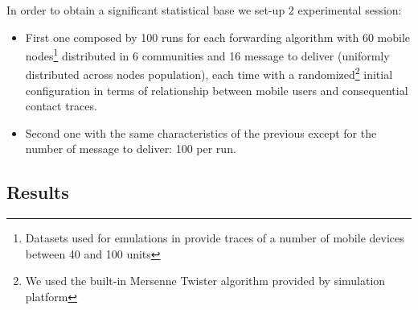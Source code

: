 In order to obtain a significant statistical base we set-up 2 experimental session:
\begin{itemize}
\item First one composed by 100 runs for each forwarding algorithm with 60 mobile nodes\footnote{Datasets used for emulations in\cite{bubble} provide traces of a number of mobile devices between 40 and 100 units} distributed in 6 communities and 16 message to deliver (uniformly distributed across nodes population), each time with a randomized\footnote{We used the built-in Mersenne Twister algorithm provided by simulation platform} initial configuration in terms of relationship between mobile users and consequential contact traces.
\item Second one with the same characteristics of the previous except for the number of message to deliver: 100 per run. 
\end{itemize} 





\subsection{Results}
\label{exp_results}


